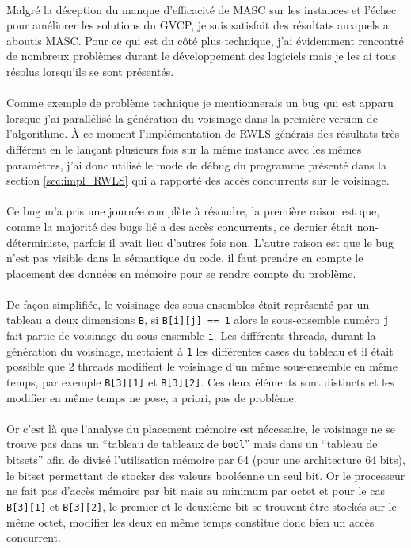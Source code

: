 \documentclass[a4paper,11pt,twoside,french,report]{../common/simplem}
\begin{document}
			\paragraph*{}
				Malgré la déception du manque d'efficacité de \gls{MASC} sur les instances  et l'échec pour améliorer les solutions du \gls{GVCP}, je suis satisfait des résultats auxquels a aboutis \gls{MASC}. Pour ce qui est du côté plus technique, j'ai évidemment rencontré de nombreux problèmes durant le développement des logiciels mais je les ai tous résolus lorsqu’ils se sont présentés.
			\paragraph*{}
				Comme exemple de problème technique je mentionnerais un bug qui est apparu lorsque j'ai parallélisé la génération du voisinage dans la première version de l'algorithme. À ce moment l'implémentation de \gls{RWLS} générais des résultats très différent en le lançant plusieurs fois sur la même instance avec les mêmes paramètres, j'ai donc utilisé le mode de débug du programme présenté dans la section \ref{sec:impl_RWLS} qui a rapporté des accès concurrents sur le voisinage.
			\paragraph*{}
				Ce bug m'a pris une journée complète à résoudre, la première raison est que, comme la majorité des bugs lié a des accès concurrents, ce dernier était non-déterministe, parfois il avait lieu d'autres fois non. L'autre raison est que le bug n'est pas visible dans la sémantique du code, il faut prendre en compte le placement des données en mémoire pour se rendre compte du problème.
			\paragraph*{}
				De façon simplifiée, le voisinage des sous-ensembles était représenté par un tableau a deux dimensions \texttt{B}, si \texttt{B[i][j] == 1} alors le sous-ensemble numéro \texttt{j} fait partie de voisinage du sous-ensemble \texttt{i}. Les différents threads, durant la génération du voisinage, mettaient à \texttt{1} les différentes cases du tableau et il était possible que 2 threads modifient le voisinage d'un même sous-ensemble en même temps, par exemple \texttt{B[3][1]} et \texttt{B[3][2]}. Ces deux éléments sont distincts et les modifier en même temps ne pose, a priori, pas de problème.
			\paragraph*{}
				Or c'est là que l'analyse du placement mémoire est nécessaire, le voisinage ne se trouve pas dans un ``tableau de tableaux de \texttt{bool}'' mais dans un ``tableau de bitsets'' afin de divisé l'utilisation mémoire par 64 (pour une architecture 64 bits), le bitset permettant de stocker des valeurs booléenne un seul bit. Or le processeur ne fait pas d'accès mémoire par bit mais au minimum par octet et pour le cas \texttt{B[3][1]} et \texttt{B[3][2]}, le premier et le deuxième bit se trouvent être stockés sur le même octet, modifier les deux en même temps constitue donc bien un accès concurrent.
\end{document}
